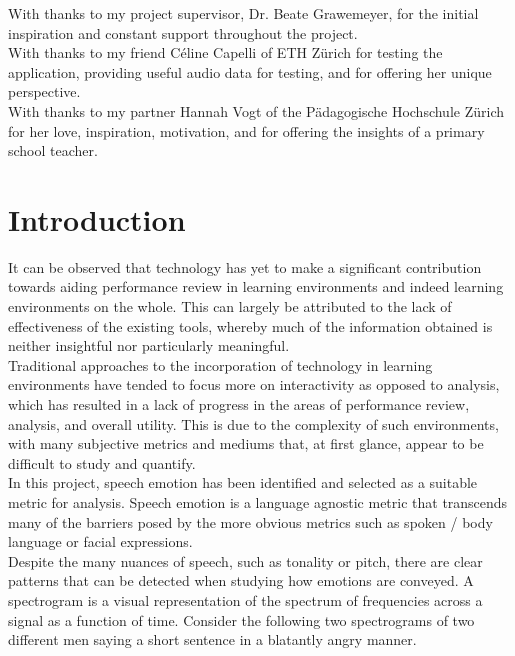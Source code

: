 \documentclass[12pt]{article}
\begin{document}
With thanks to my project supervisor, Dr. Beate Grawemeyer, for the initial inspiration and constant support throughout the project.
\\

\noindent With thanks to my friend Céline Capelli of ETH Zürich for testing the application, providing useful audio data for testing, and for offering her unique perspective.
\\

\noindent With thanks to my partner Hannah Vogt of the Pädagogische Hochschule Zürich for her love, inspiration, motivation, and for offering the insights of a primary school teacher. 
\\
\newpage

\section{Introduction}

It can be observed that technology has yet to make a significant contribution towards aiding performance review in learning environments and indeed learning environments on the whole. This can largely be attributed to the lack of effectiveness of the existing tools, whereby much of the information obtained is neither insightful nor particularly meaningful.
\\

\noindent Traditional approaches to the incorporation of technology in learning environments have tended to focus more on interactivity as opposed to analysis, which has resulted in a lack of progress in the areas of performance review, analysis, and overall utility. This is due to the complexity of such environments, with many subjective metrics and mediums that, at first glance, appear to be difficult to study and quantify.
\\

\noindent In this project, speech emotion has been identified and selected as a suitable metric for analysis. Speech emotion is a language agnostic metric that transcends many of the barriers posed by the more obvious metrics such as spoken / body language or facial expressions.
\\

\noindent Despite the many nuances of speech, such as tonality or pitch, there are clear patterns that can be detected when studying how emotions are conveyed. A spectrogram is a visual representation of the spectrum of frequencies across a signal as a function of time. Consider the following two spectrograms of two different men saying a short sentence in a blatantly angry manner. 
\\
\end{document}
